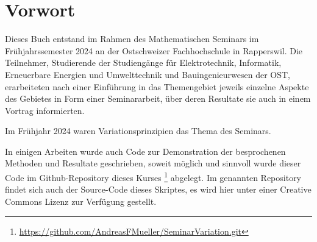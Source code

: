 %
%
%
\chapter*{Vorwort}


Dieses Buch entstand im Rahmen des Mathematischen Seminars
im Frühjahrssemester 2024 an der Ostschweizer Fachhochschule in Rapperswil.
Die Teilnehmer, Studierende der Studiengänge für Elektrotechnik, Informatik,
Erneuerbare Energien und Umwelttechnik und Bauingenieurwesen
der OST, erarbeiteten nach einer Einführung in das Themengebiet jeweils
einzelne Aspekte des Gebietes in Form einer Seminararbeit, über
deren Resultate sie auch in einem Vortrag informierten. 

Im Frühjahr 2024 waren Variationsprinzipien das Thema des Seminars.

In einigen Arbeiten wurde auch Code zur Demonstration der 
besprochenen Methoden und Resultate geschrieben, soweit
möglich und sinnvoll wurde dieser Code im Github-Repository
%
dieses Kurses%
\footnote{\url{https://github.com/AndreasFMueller/SeminarVariation.git}}
\cite{buch:repo}
abgelegt.
Im genannten Repository findet sich auch der Source-Code dieses
Skriptes, es wird hier unter einer Creative Commons Lizenz
zur Verfügung gestellt.

